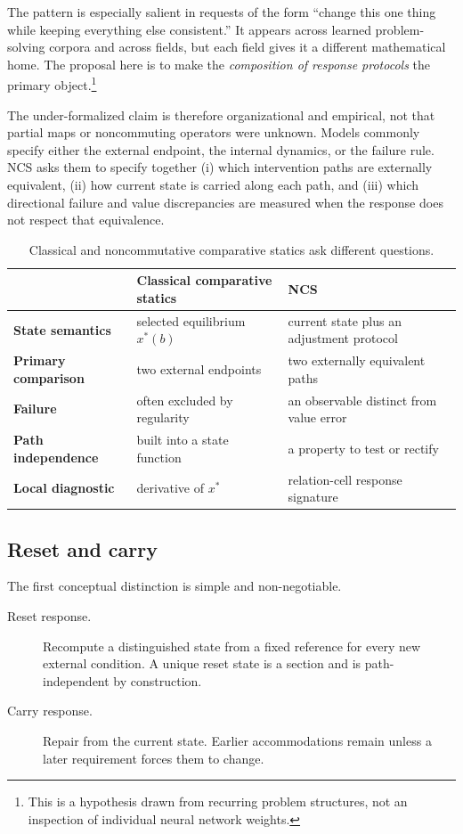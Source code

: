 \documentclass[11pt]{article}
\theoremstyle{definition}
\theoremstyle{remark}
\begin{document}
The pattern is especially salient in requests of the form ``change this one
thing while keeping everything else consistent.'' It appears across learned
problem-solving corpora and across fields, but each field gives it a different
mathematical home. The proposal here is to make the \emph{composition of
response protocols} the primary object.\footnote{This is a hypothesis drawn
from recurring problem structures, not an inspection of individual neural
network weights.}

The under-formalized claim is therefore organizational and empirical, not
that partial maps or noncommuting operators were unknown. Models commonly
specify either the external endpoint, the internal dynamics, or the failure
rule. NCS asks them to specify together (i) which intervention paths are
externally equivalent, (ii) how current state is carried along each path, and
(iii) which directional failure and value discrepancies are measured when
the response does not respect that equivalence.

\begin{table}[t]
\centering
\caption{Classical and noncommutative comparative statics ask different
questions.}
\label{tab:questions}
\begin{tabularx}{\textwidth}{>{\bfseries}p{}XX}
\toprule
 & Classical comparative statics & NCS \\
\midrule
State semantics & selected equilibrium \(x^\ast(b)\) &
current state plus an adjustment protocol \\
Primary comparison & two external endpoints &
two externally equivalent paths \\
Failure & often excluded by regularity &
an observable distinct from value error \\
Path independence & built into a state function &
a property to test or rectify \\
Local diagnostic & derivative of \(x^\ast\) &
relation-cell response signature \\
\bottomrule
\end{tabularx}
\end{table}

\subsection{Reset and carry}

The first conceptual distinction is simple and non-negotiable.

\begin{description}
\item[Reset response.] Recompute a distinguished state from a fixed reference
for every new external condition. A unique reset state is a section and is
path-independent by construction.
\item[Carry response.] Repair from the current state. Earlier accommodations
remain unless a later requirement forces them to change.
\end{description}
\end{document}
